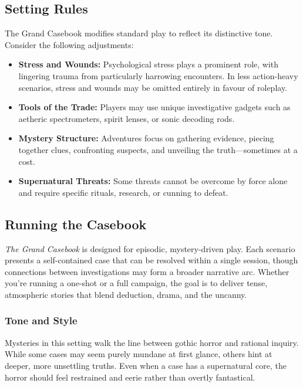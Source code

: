 \subsection{Setting Rules}

The Grand Casebook modifies standard play to reflect its distinctive tone. Consider the following adjustments:

\begin{itemize}
    \item \textbf{Stress and Wounds:} Psychological stress plays a prominent role, with lingering trauma from particularly harrowing encounters. In less action-heavy scenarios, stress and wounds may be omitted entirely in favour of roleplay.
    
    \item \textbf{Tools of the Trade:} Players may use unique investigative gadgets such as aetheric spectrometers, spirit lenses, or sonic decoding rods.
    
    \item \textbf{Mystery Structure:} Adventures focus on gathering evidence, piecing together clues, confronting suspects, and unveiling the truth—sometimes at a cost.
    
    \item \textbf{Supernatural Threats:} Some threats cannot be overcome by force alone and require specific rituals, research, or cunning to defeat.
\end{itemize}

\subsection{Running the Casebook}

\noindent
\textit{The Grand Casebook} is designed for episodic, mystery-driven play. Each scenario presents a self-contained case that can be resolved within a single session, though connections between investigations may form a broader narrative arc. Whether you're running a one-shot or a full campaign, the goal is to deliver tense, atmospheric stories that blend deduction, drama, and the uncanny.

\subsubsection*{Tone and Style}

Mysteries in this setting walk the line between gothic horror and rational inquiry. While some cases may seem purely mundane at first glance, others hint at deeper, more unsettling truths. Even when a case has a supernatural core, the horror should feel restrained and eerie rather than overtly fantastical.

